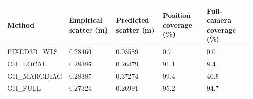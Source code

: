 \begin{tabular}{lllll}
\hline
Method & Empirical scatter (m) & Predicted scatter (m) & Position coverage (\%) & Full-camera coverage (\%) \\
\hline
FIXED3D\_WLS & 0.28460 & 0.03589 & 0.7 & 0.0 \\
GH\_LOCAL & 0.28386 & 0.26479 & 91.1 & 8.4 \\
GH\_MARGDIAG & 0.28387 & 0.37274 & 99.4 & 40.9 \\
GH\_FULL & 0.27324 & 0.26991 & 95.2 & 94.7 \\
\hline
\end{tabular}
